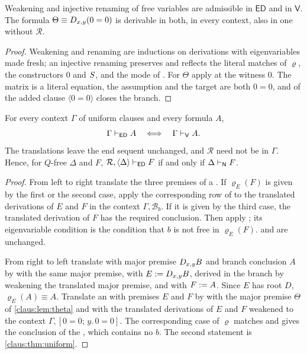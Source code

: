 \begin{lemma}
\label{claus:lem:theta}
Weakening and injective renaming of free variables are admissible in
$\mathsf{ED}$ and in $\mathsf{V}$. The formula
$\Theta\equiv D_{x,y}(0=0)$ is derivable in both, in every context, also in
one without $\mathcal{R}$.
\end{lemma}
\begin{proof}
Weakening and renaming are inductions on derivations with eigenvariables
made fresh; an injective renaming preserves and reflects the literal
matches of $\varrho$, the constructors $0$ and $S$, and the mode of
. For $\Theta$ apply  at the witness $0$.
The matrix is a literal equation, the assumption and the target are both
$0=0$, and  of the added clause $\langle 0=0\rangle$ closes
the branch.
\end{proof}

\begin{theorem}
\label{claus:thm:fusion}
For every context $\Gamma$ of uniform clauses and every formula $A$,
\[
 \Gamma\vdash_{\mathsf{ED}}A\quad\Longleftrightarrow\quad
 \Gamma\vdash_{\mathsf{V}}A .
\]
The translations leave the end sequent unchanged, and $\mathcal{R}$ need
not be in $\Gamma$. Hence, for $Q$-free $\Delta$ and $F$,
$\mathcal{R},\langle\Delta\rangle\vdash_{\mathsf{ED}}F$ if and only if
$\Delta\vdash_{\mathsf{N}}F$.
\end{theorem}
\begin{proof}
From left to right translate the three premises of a
. If $\varrho_E(F)$ is given by the first or the
second case, apply the corresponding row of  to the
translated derivations of $E$ and $F$ in the context
$\Gamma,\mathcal{B}_b$. If it is given by the third case, the translated
derivation of $F$ has the required conclusion. Then apply ;
its eigenvariable condition is the condition that $b$ is not free in
$\varrho_E(F)$.  and  are unchanged.

From right to left translate  with major premise
$D_{x,y}B$ and branch conclusion $A$ by  with the
same major premise, with $E\mathrel{:=}D_{x,y}B$, derived in the branch by
weakening the translated major premise, and with $F\mathrel{:=} A$. Since $E$
has root $D$, $\varrho_E(A)\equiv A$. Translate an  with
premises $E$ and $F$ by  with the major premise
$\Theta$ of \cref{claus:lem:theta} and with the translated derivations of
$E$ and $F$ weakened to the context
$\Gamma,[0=0;\,y.\,0=0]$. The corresponding case of $\varrho$ matches and
gives the conclusion of the , which contains no $b$. The
second statement is \cref{claus:thm:uniform}.
\end{proof}


